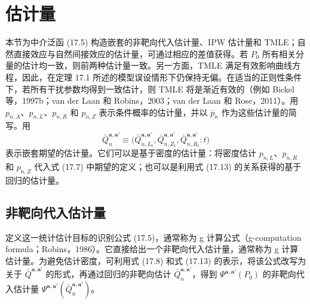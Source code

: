 \section{估计量}

本节为中介泛函 (17.5) 构造嵌套的非靶向代入估计量、IPW 估计量和 TMLE；自然直接效应与自然间接效应的估计量，可通过相应的差值获得。若 $P_0$ 所有相关分量的估计均一致，则前两种估计量一致。另一方面，TMLE 满足有效影响曲线方程，因此，在定理 17.1 所述的模型误设情形下仍保持无偏。在适当的正则性条件下，若所有干扰参数均得到一致估计，则 TMLE 将是渐近有效的（例如 Bickel 等，1997b；van der Laan 和 Robins，2003；van der Laan 和 Rose，2011）。用 $p_{n,A}$、$p_{n,L}$、$p_{n,R}$ 和 $p_{n,Z}$ 表示条件概率的估计量，并以 $\bar p_n$ 作为这些估计量的简写。用
\[
 \bar Q_n^{\mathbf a,\mathbf a'}\equiv
 \bigl(\bar Q_{n,L_t}^{\mathbf a,\mathbf a'},
 \bar Q_{n,Z_t}^{\mathbf a,\mathbf a'},
 \bar Q_{n,R_t}^{\mathbf a,\mathbf a'}:t\bigr)
\]
表示嵌套期望的估计量。它们可以是基于密度的估计量：将密度估计 $p_{n,L}$、$p_{n,R}$ 和 $p_{n,Z}$ 代入式 (17.7) 中期望的定义；也可以是利用式 (17.13) 的关系获得的基于回归的估计量。

\subsection{非靶向代入估计量}

定义这一统计估计目标的识别公式 (17.5)，通常称为 g 计算公式（g-computation formula；Robins，1986）。它直接给出一个非靶向代入估计量，通常称为 g 计算估计量。为避免估计密度，可利用式 (17.8) 和式 (17.13) 的表示，将该公式改写为关于 $\bar Q^{\mathbf a,\mathbf a'}$ 的形式，再通过回归的非靶向估计 $\bar Q_n^{\mathbf a,\mathbf a'}$，得到 $\Psi^{\mathbf a,\mathbf a'}(P_0)$ 的非靶向代入估计量 $\Psi^{\mathbf a,\mathbf a'}(\bar Q_n^{\mathbf a,\mathbf a'})$。

